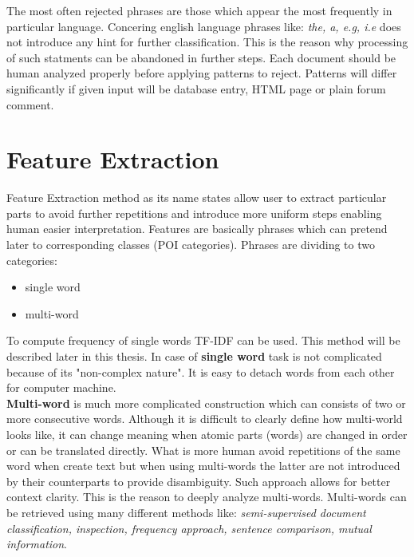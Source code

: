 The most often rejected phrases are those which appear the most frequently in particular language. Concering english language phrases like: \textit{the, a, e.g, i.e} does not introduce any hint for further classification. This is the reason why processing of such statments can be abandoned in further steps. Each document should be human analyzed properly before applying patterns to reject. Patterns will differ significantly if given input will be database entry, HTML page or plain forum comment.

\section{Feature Extraction}

Feature Extraction method as its name states allow user to extract particular parts to avoid further repetitions and introduce more uniform steps enabling human easier interpretation. Features are basically phrases which can pretend later to corresponding classes (POI categories). Phrases are dividing to two categories:
\begin{itemize}
	\item single word
	\item multi-word
\end{itemize}
To compute frequency of single words TF-IDF\cite{wiki_a}\cite{3} can be used. This method will be described later in this thesis. In case of \textbf{single word} task is not complicated because of its "non-complex nature". It is easy to detach words from each other for computer machine.
\\ \newline\textbf{Multi-word} is much more complicated construction which can consists of two or more consecutive words. Although it is difficult to clearly define how multi-world looks like, it can change meaning when atomic parts (words) are changed in order or can be translated directly. What is more human avoid repetitions of the same word when create text but when using multi-words the latter are not introduced by their counterparts to provide disambiguity. Such approach allows for better context clarity. This is the reason to deeply analyze multi-words. Multi-words can be retrieved using many different methods like: \textit{semi-supervised document classification, inspection, frequency approach, sentence comparison, mutual information}\cite{1}.

